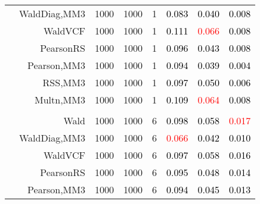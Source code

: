 \documentclass[
]{article}
\begin{document}
\begin{table}[H]
{\begin{tabular}[t]{lrrrrrrr}
\hspace{1em} & WaldDiag,MM3 & 1000 & 1000 & 1 & \textcolor{black}{0.083} & \textcolor{black}{0.040} & \textcolor{black}{0.008}\\

\hspace{1em} & WaldVCF & 1000 & 1000 & 1 & \textcolor{black}{0.111} & \textcolor{red}{0.066} & \textcolor{black}{0.008}\\

\hspace{1em} & PearsonRS & 1000 & 1000 & 1 & \textcolor{black}{0.096} & \textcolor{black}{0.043} & \textcolor{black}{0.008}\\

\hspace{1em} & Pearson,MM3 & 1000 & 1000 & 1 & \textcolor{black}{0.094} & \textcolor{black}{0.039} & \textcolor{black}{0.004}\\

\hspace{1em} & RSS,MM3 & 1000 & 1000 & 1 & \textcolor{black}{0.097} & \textcolor{black}{0.050} & \textcolor{black}{0.006}\\

\hspace{1em} & Multn,MM3 & 1000 & 1000 & 1 & \textcolor{black}{0.109} & \textcolor{red}{0.064} & \textcolor{black}{0.008}\\
\cmidrule{1-8}
\addlinespace[0.3em]
\multicolumn{8}{l}{\textbf{1F 15V}}\\
\hspace{1em} & Wald & 1000 & 1000 & 6 & \textcolor{black}{0.098} & \textcolor{black}{0.058} & \textcolor{red}{0.017}\\

\hspace{1em} & WaldDiag,MM3 & 1000 & 1000 & 6 & \textcolor{red}{0.066} & \textcolor{black}{0.042} & \textcolor{black}{0.010}\\

\hspace{1em} & WaldVCF & 1000 & 1000 & 6 & \textcolor{black}{0.097} & \textcolor{black}{0.058} & \textcolor{black}{0.016}\\

\hspace{1em} & PearsonRS & 1000 & 1000 & 6 & \textcolor{black}{0.095} & \textcolor{black}{0.048} & \textcolor{black}{0.014}\\

\hspace{1em} & Pearson,MM3 & 1000 & 1000 & 6 & \textcolor{black}{0.094} & \textcolor{black}{0.045} & \textcolor{black}{0.013}\\


\end{tabular}}
\end{table}
\end{document}
